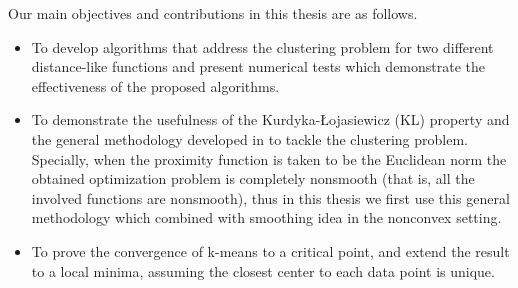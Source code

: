 Our main objectives and contributions in this thesis are as follows.
\begin{itemize}
	\item To develop algorithms that address the clustering problem for two different distance-like functions and present numerical tests which demonstrate the effectiveness of the proposed algorithms.
	
	\item To demonstrate the usefulness of the Kurdyka-{\L}ojasiewicz (KL) property and the general methodology developed in \cite{BST2014} to tackle the clustering problem. Specially, when the proximity function is taken to be the Euclidean norm the obtained optimization problem is completely nonsmooth (that is, all the involved functions are nonsmooth), thus in this thesis we first use this general methodology which combined with smoothing idea in the nonconvex setting.
  
	\item To prove the convergence of k-means to a critical point, and extend the result to a local minima, assuming the closest center to each data point is unique.
\end{itemize}

